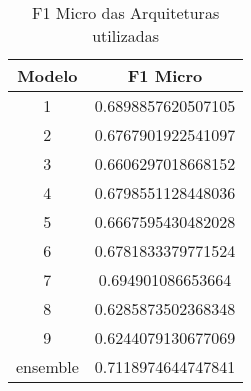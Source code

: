 \begin{table}
\centering
\caption{F1 Micro das Arquiteturas utilizadas}
\label{tbl-fscore}
\begin{tabular}{@{}cc@{}}
\toprule
Modelo & F1 Micro           \\ \midrule
1      & 0.6898857620507105 \\
2      & 0.6767901922541097 \\
3      & 0.6606297018668152 \\
4      & 0.6798551128448036 \\
5      & 0.6667595430482028 \\
6      & 0.6781833379771524 \\
7      & 0.694901086653664  \\
8      & 0.6285873502368348 \\
9      & 0.6244079130677069 \\ 
ensemble & 0.7118974644747841 \\ \bottomrule
\end{tabular}
\end{table}